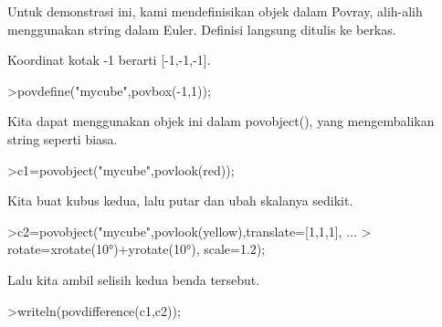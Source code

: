 \documentclass[a4paper,10pt]{article}
\begin{document}
\begin{eulernotebook}
\begin{eulercomment}
\begin{eulercomment}
\begin{eulercomment}
\begin{eulercomment}
\begin{eulercomment}
\begin{eulercomment}
\begin{eulercomment}
\begin{eulercomment}
\begin{eulercomment}
\begin{eulercomment}
\begin{eulercomment}
\begin{eulercomment}
\begin{eulercomment}
\begin{eulercomment}
\begin{eulercomment}
\begin{eulercomment}
\begin{eulercomment}
\begin{eulercomment}
\begin{eulercomment}
\begin{eulercomment}
\begin{eulercomment}
\begin{eulercomment}
\begin{eulercomment}
\begin{eulercomment}
\begin{eulercomment}
\begin{eulercomment}
\begin{eulercomment}
\begin{eulercomment}
\begin{eulercomment}
\begin{eulercomment}
\begin{eulercomment}
\begin{eulercomment}
\begin{eulercomment}
\begin{eulercomment}
\begin{eulercomment}
\begin{eulercomment}
\begin{eulercomment}
\begin{eulercomment}
\begin{eulercomment}
\begin{eulercomment}
\begin{eulerprompt}
\end{eulerprompt}
\begin{eulercomment}
Untuk demonstrasi ini, kami mendefinisikan objek dalam Povray,
alih-alih menggunakan string dalam Euler. Definisi langsung ditulis ke
berkas.

Koordinat kotak -1 berarti [-1,-1,-1].
\end{eulercomment}
\begin{eulerprompt}
>povdefine("mycube",povbox(-1,1));
\end{eulerprompt}
\begin{eulercomment}
Kita dapat menggunakan objek ini dalam povobject(), yang mengembalikan
string seperti biasa.
\end{eulercomment}
\begin{eulerprompt}
>c1=povobject("mycube",povlook(red));
\end{eulerprompt}
\begin{eulercomment}
Kita buat kubus kedua, lalu putar dan ubah skalanya sedikit.
\end{eulercomment}
\begin{eulerprompt}
>c2=povobject("mycube",povlook(yellow),translate=[1,1,1], ...
>  rotate=xrotate(10°)+yrotate(10°), scale=1.2);
\end{eulerprompt}
\begin{eulercomment}
Lalu kita ambil selisih kedua benda tersebut.
\end{eulercomment}
\begin{eulerprompt}
>writeln(povdifference(c1,c2));
\end{eulerprompt}
\begin{eulercomment}

\end{eulercomment}
\end{eulercomment}
\end{eulercomment}
\end{eulercomment}
\end{eulercomment}
\end{eulercomment}
\end{eulercomment}
\end{eulercomment}
\end{eulercomment}
\end{eulercomment}
\end{eulercomment}
\end{eulercomment}
\end{eulercomment}
\end{eulercomment}
\end{eulercomment}
\end{eulercomment}
\end{eulercomment}
\end{eulercomment}
\end{eulercomment}
\end{eulercomment}
\end{eulercomment}
\end{eulercomment}
\end{eulercomment}
\end{eulercomment}
\end{eulercomment}
\end{eulercomment}
\end{eulercomment}
\end{eulercomment}
\end{eulercomment}
\end{eulercomment}
\end{eulercomment}
\end{eulercomment}
\end{eulercomment}
\end{eulercomment}
\end{eulercomment}
\end{eulercomment}
\end{eulercomment}
\end{eulercomment}
\end{eulercomment}
\end{eulercomment}
\end{eulercomment}
\end{eulernotebook}
\end{document}
